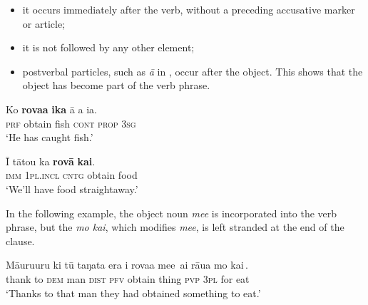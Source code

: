 \begin{itemize}
\item 
it occurs immediately after the verb, without a preceding accusative marker or article; 

\item 
it is not followed by any other  element;

\item 
postverbal particles, such as \textit{{\ꞌ}ā} in , occur after the object. This shows that the object has become part of the verb phrase.

\end{itemize}

\ea\label{ex:8.153}
\gll Ko \textbf{rova{\ꞌ}a} \textbf{ika} {\ꞌ}ā a ia. \\
\textsc{prf} obtain fish \textsc{cont} \textsc{prop} \textsc{3sg} \\

\glt 
‘He has caught fish.’ \textstyleExampleref{[R416.112]} 
\z

\ea\label{ex:8.154}
\gll {\ꞌ}Ī tātou ka \textbf{rovā} \textbf{kai}. \\
\textsc{imm} \textsc{1pl.incl} \textsc{cntg} obtain food \\

\glt
‘We’ll have food straightaway.’ \textstyleExampleref{[R352.067]} 
\z

In the following example, the object noun \textit{me{\ꞌ}e} is incorporated into the verb phrase, but the  \textit{mo kai}, which modifies \textit{me{\ꞌ}e}, is left stranded at the end of the clause.

\ea\label{ex:8.155}
\gll Māuruuru ki tū taŋata era i rova{\ꞌ}a {\ob}me{\ꞌ}e\,{\cb} ai rāua {\ob}mo kai\,{\cb}. \\
thank to \textsc{dem} man \textsc{dist} \textsc{pfv} obtain {\db}thing \textsc{pvp} \textsc{3pl} {\db}for eat \\

\glt 
‘Thanks to that man they had obtained something to eat.’ \textstyleExampleref{[R349.021]}\textstyleExampleref{} 
\z
{}

